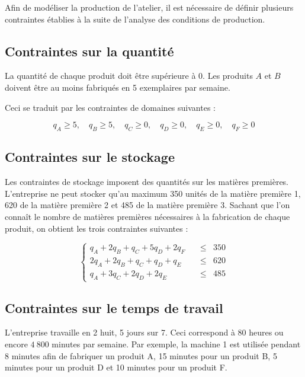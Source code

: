 \documentclass[paper=a4, fontsize=11pt]{report}
\numberwithin{equation}{section}		%
\numberwithin{figure}{section}			%
\numberwithin{table}{section}				%
\begin{document}
Afin de modéliser la production de l'atelier, il est nécessaire de définir plusieurs contraintes établies à la suite de l'analyse des conditions de production.

\subsection{Contraintes sur la quantité}

La quantité de chaque produit doit être supérieure à 0. Les produits $A$ et $B$ doivent être au moins fabriqués en 5 exemplaires par semaine.

Ceci se traduit par les contraintes de domaines suivantes : 

\begin{equation}
q_A \geq 5, \quad q_B \geq 5, \quad q_C \geq 0, \quad q_D \geq 0, \quad q_E \geq 0, \quad q_F \geq 0 
\label{ctr_quantite}
\end{equation} 

\subsection{Contraintes sur le stockage}
Les contraintes de stockage imposent des quantités sur les matières premières. L'entreprise ne peut stocker qu'au maximum 350 unités de la matière première 1, 620 de la matière première 2 et 485 de la matière première 3. Sachant que l'on connaît le nombre de matières premières nécessaires à la fabrication de chaque produit, on obtient les trois contraintes suivantes :  

\begin{equation}
  \left\{
    \begin{aligned}
q_A + 2 q_B + q_C + 5q_D + 2q_F \quad & \leq & 350 \\
2q_A + 2q_B + q_C + q_D + q_E \quad & \leq & 620 \\
q_A + 3 q_C + 2q_D + 2q_E \quad & \leq & 485 
    \end{aligned}
  \right.
\label{ctr_stockage}
\end{equation}

\subsection{Contraintes sur le temps de travail}

L'entreprise travaille en 2 huit, 5 jours sur 7. Ceci correspond à 80 heures ou encore $4\:800$ minutes par semaine. Par exemple, la machine 1 est utilisée pendant 8 minutes afin de fabriquer un produit A, 15 minutes pour un produit B, 5 minutes pour un produit D et 10 minutes pour un produit F.
\end{document}
